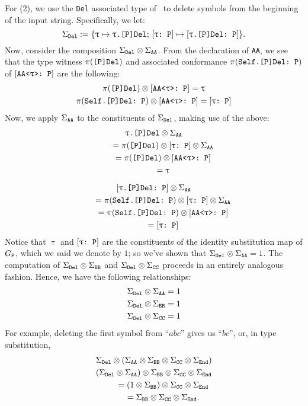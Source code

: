 \documentclass[../generics]{subfiles}
\begin{document}
For (2), we use the \texttt{Del} associated type of \tP\ to delete symbols from the beginning of the input string. Specifically, we let:
\[
\Sigma_{\texttt{Del}} := \{\texttt{$\uptau$} \mapsto \texttt{$\uptau$.[P]Del};\,[\texttt{$\uptau$:~P}] \mapsto [\texttt{$\uptau$.[P]Del:~P}]\}.
\]
Now, consider the composition $\Sigma_{\texttt{Del}}\otimes\Sigma_{\texttt{AA}}$. From the declaration of \texttt{AA}, we see that the type witness $\pi(\texttt{[P]Del})$ and associated conformance $\pi(\texttt{Self.[P]Del:~P})$ of $[\texttt{AA<$\uptau$>:~P}]$ are the following:
\begin{gather*}
\pi(\texttt{[P]Del})\otimes[\texttt{AA<$\uptau$>:~P}]=\uptau\\
\pi(\texttt{Self.[P]Del:~P})\otimes[\texttt{AA<$\uptau$>:~P}]=[\texttt{$\uptau$:~P}]
\end{gather*}
Now, we apply $\Sigma_{\texttt{AA}}$ to the constituents of $\Sigma_{\texttt{Del}}$, making use of the above:
\begin{gather*}
\texttt{$\uptau$.[P]Del} \otimes \Sigma_{\texttt{AA}}\\
\qquad {} = \pi(\texttt{[P]Del}) \otimes [\texttt{$\uptau$:~P}] \otimes \Sigma_{\texttt{AA}}\\
\qquad {} = \pi(\texttt{[P]Del}) \otimes [\texttt{AA<$\uptau$>:~P}]\\
\qquad {} = \uptau\\[\medskipamount]
[\texttt{$\uptau$.[P]Del:~P}] \otimes \Sigma_{\texttt{AA}}\\
\qquad {} = \pi(\texttt{Self.[P]Del:~P}) \otimes [\texttt{$\uptau$:~P}] \otimes \Sigma_{\texttt{AA}}\\
\qquad {} = \pi(\texttt{Self.[P]Del:~P}) \otimes [\texttt{AA<$\uptau$>:~P}]\\
\qquad {} = [\texttt{$\uptau$:~P}]
\end{gather*}
Notice that $\uptau$ and $[\texttt{$\uptau$:~P}]$ are the constituents of the identity substitution map of $G_{\texttt{P}}$, which we said we denote by $1$; so we've shown that $\Sigma_{\texttt{Del}}\otimes\Sigma_{\texttt{AA}}=1$. The computation of $\Sigma_{\texttt{Del}}\otimes\Sigma_{\texttt{BB}}$ and $\Sigma_{\texttt{Del}}\otimes\Sigma_{\texttt{CC}}$ proceeds in an entirely analogous fashion. Hence, we have the following relationships:
\begin{gather*}
\Sigma_{\texttt{Del}}\otimes\Sigma_{\texttt{AA}} = 1\\
\Sigma_{\texttt{Del}}\otimes\Sigma_{\texttt{BB}} = 1\\
\Sigma_{\texttt{Del}}\otimes\Sigma_{\texttt{CC}} = 1
\end{gather*}
For example, deleting the first symbol from ``$abc$'' gives us ``$bc$'', or, in type substitution,
\begin{gather*}
\Sigma_{\texttt{Del}}\otimes\left(\Sigma_{\texttt{AA}}\otimes\Sigma_{\texttt{BB}}\otimes\Sigma_{\texttt{CC}}\otimes\Sigma_{\texttt{End}}\right)\\
\left(\Sigma_{\texttt{Del}}\otimes\Sigma_{\texttt{AA}}\right)\otimes\Sigma_{\texttt{BB}}\otimes\Sigma_{\texttt{CC}}\otimes\Sigma_{\texttt{End}}\\
\qquad {} =\left(1\otimes\Sigma_{\texttt{BB}}\right)\otimes\Sigma_{\texttt{CC}}\otimes\Sigma_{\texttt{End}}\\
\qquad {} =\Sigma_{\texttt{BB}}\otimes\Sigma_{\texttt{CC}}\otimes\Sigma_{\texttt{End}}.
\end{gather*}
\end{document}
